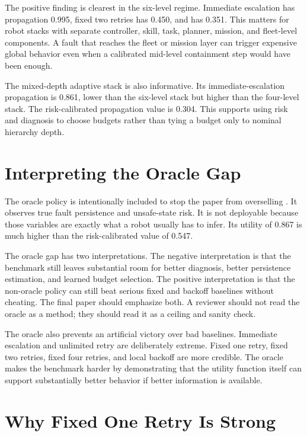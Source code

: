 The positive finding is clearest in the six-level regime. Immediate escalation has propagation 0.995, fixed two retries has 0.450, and \method has 0.351. This matters for robot stacks with separate controller, skill, task, planner, mission, and fleet-level components. A fault that reaches the fleet or mission layer can trigger expensive global behavior even when a calibrated mid-level containment step would have been enough.

The mixed-depth adaptive stack is also informative. Its immediate-escalation propagation is 0.861, lower than the six-level stack but higher than the four-level stack. The risk-calibrated propagation value is 0.304. This supports using risk and diagnosis to choose budgets rather than tying a budget only to nominal hierarchy depth.

\section{Interpreting the Oracle Gap}

The oracle policy is intentionally included to stop the paper from overselling \method. It observes true fault persistence and unsafe-state risk. It is not deployable because those variables are exactly what a robot usually has to infer. Its utility of 0.867 is much higher than the risk-calibrated value of 0.547.

The oracle gap has two interpretations. The negative interpretation is that the benchmark still leaves substantial room for better diagnosis, better persistence estimation, and learned budget selection. The positive interpretation is that the non-oracle policy can still beat serious fixed and backoff baselines without cheating. The final paper should emphasize both. A reviewer should not read the oracle as a method; they should read it as a ceiling and sanity check.

The oracle also prevents an artificial victory over bad baselines. Immediate escalation and unlimited retry are deliberately extreme. Fixed one retry, fixed two retries, fixed four retries, and local backoff are more credible. The oracle makes the benchmark harder by demonstrating that the utility function itself can support substantially better behavior if better information is available.

\section{Why Fixed One Retry Is Strong}

